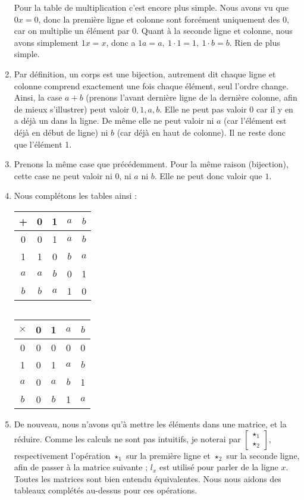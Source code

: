\documentclass[10p,a4paper]{scrartcl}
\renewcommand{\(}{\left(}
\renewcommand{\)}{\right)}
\begin{document}
\begin{enumerate}
			Pour la table de multiplication c'est encore plus simple. Nous avons vu que $0x = 0$, donc la première ligne et colonne sont forcément uniquement des 0, car on multiplie un élément par 0. Quant à la seconde ligne et colonne, nous avons simplement $1x = x$, donc a $1a = a,\ 1\cdot 1 = 1,\ 1\cdot b = b$. Rien de plus simple.
	\item	Par définition, un corps est une bijection, autrement dit chaque ligne et colonne comprend exactement une fois chaque élément, seul l'ordre change. Ainsi, la case $a+b$ (prenons l'avant dernière ligne de la dernière colonne, afin de mieux s'illustrer) peut valoir $0,1,a,b$. Elle ne peut pas valoir 0 car il y en a déjà un dans la ligne. De même elle ne peut valoir ni $a$ (car l'élément est déjà en début de ligne) ni $b$ (car déjà en haut de colonne). Il ne reste donc que l'élément 1.
	\item	Prenons la même case que précédemment. Pour la même raison (bijection), cette case ne peut valoir ni $0$, ni $a$ ni $b$. Elle ne peut donc valoir que $1$.
	\item	Nous complétons les tables ainsi :
			\begin{center}
				\begin{tabular}{c||c|c|c|c}
					+ & 0 & 1 &$a$& $b$\\
					\hline
					\hline
					0 & 0 & 1 &$a$& $b$\\
					\hline
					1 & 1 & 0 & $b$ & $a$\\
					\hline
					$a$ &$a$& $b$ & 0 & 1\\
					\hline
					$b$ & $b$ &$a$& 1 & 0
				\end{tabular}
				$\qquad \quad$
				\begin{tabular}{c||c|c|c|c}
					$\times $& 0 & 1 &$a$& $b$\\
					\hline
					\hline
					0 & 0 & 0 & 0 & 0\\
					\hline
					1 & 0 & 1 &$a$& $b$\\
					\hline
					$a$ & 0 &$a$& $b$ & 1\\
					\hline
					$b$ & 0 & $b$ & 1 &$a$
				\end{tabular}						
			\end{center}
	\item	De nouveau, nous n'avons qu'à mettre les éléments dans une matrice, et la réduire. Comme les calculs ne sont pas intuitifs, je noterai par $\begin{bmatrix} \star_1 \\ \star_2 \end{bmatrix}$, respectivement l'opération $\star_1$ sur la première ligne et $\star_2$ sur la seconde ligne, afin de passer à la matrice suivante ; $l_x$ est utilisé pour parler de la ligne $x$. Toutes les matrices sont bien entendu équivalentes. Nous nous aidons des tableaux complétés au-dessus pour ces opérations.

\end{enumerate}
\end{document}
